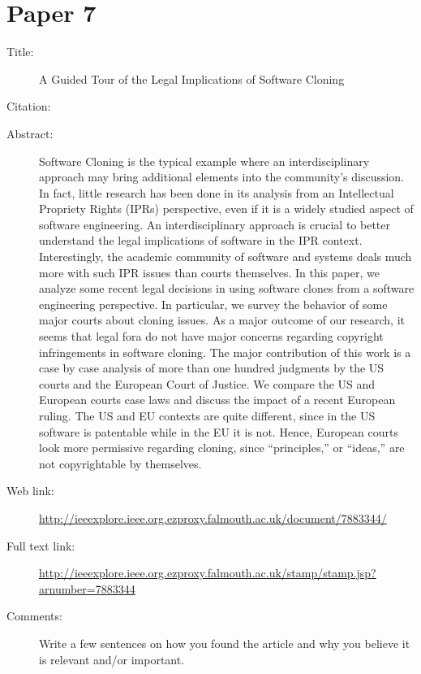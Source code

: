 \documentclass{scrartcl}
\begin{document}
\section*{Paper 7}
\begin{description}
\item[Title:] A Guided Tour of the Legal Implications of Software Cloning
\item[Citation:] \cite{SoftwareCloning}
\item[Abstract:] Software Cloning is the typical example where an interdisciplinary approach may bring additional elements into the community's discussion. In fact, little research has been done in its analysis from an Intellectual Propriety Rights (IPRs) perspective, even if it is a widely studied aspect of software engineering. An interdisciplinary approach is crucial to better understand the legal implications of software in the IPR context. Interestingly, the academic community of software and systems deals much more with such IPR issues than courts themselves. In this paper, we analyze some recent legal decisions in using software clones from a software engineering perspective. In particular, we survey the behavior of some major courts about cloning issues. As a major outcome of our research, it seems that legal fora do not have major concerns regarding copyright infringements in software cloning. The major contribution of this work is a case by case analysis of more than one hundred judgments by the US courts and the European Court of Justice. We compare the US and European courts case laws and discuss the impact of a recent European ruling. The US and EU contexts are quite different, since in the US software is patentable while in the EU it is not. Hence, European courts look more permissive regarding cloning, since “principles,” or “ideas,” are not copyrightable by themselves.
\item[Web link:] \url{http://ieeexplore.ieee.org.ezproxy.falmouth.ac.uk/document/7883344/}
\item[Full text link:] \url{http://ieeexplore.ieee.org.ezproxy.falmouth.ac.uk/stamp/stamp.jsp?arnumber=7883344}
\item[Comments:] Write a few sentences on how you found the article and why you believe it is relevant and/or important.
\end{description}
\end{document}
